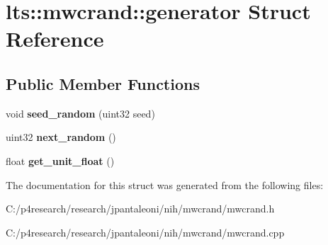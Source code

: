 \hypertarget{structlts_1_1mwcrand_1_1generator}{
\section{lts\-:\-:mwcrand\-:\-:generator \-Struct \-Reference}
\label{structlts_1_1mwcrand_1_1generator}
}
\subsection*{\-Public \-Member \-Functions}
\begin{DoxyCompactItemize}
\item 
\hypertarget{structlts_1_1mwcrand_1_1generator_a93318fe9a6c848ca32c85da536ea57f3}{
void {\bfseries seed\-\_\-random} (uint32 seed)}
\label{structlts_1_1mwcrand_1_1generator_a93318fe9a6c848ca32c85da536ea57f3}

\item 
\hypertarget{structlts_1_1mwcrand_1_1generator_a2418bf248ea16841de65ba5c89a02451}{
uint32 {\bfseries next\-\_\-random} ()}
\label{structlts_1_1mwcrand_1_1generator_a2418bf248ea16841de65ba5c89a02451}

\item 
\hypertarget{structlts_1_1mwcrand_1_1generator_a48774f0b6f6edc1cfb35161e82adf1cd}{
float {\bfseries get\-\_\-unit\-\_\-float} ()}
\label{structlts_1_1mwcrand_1_1generator_a48774f0b6f6edc1cfb35161e82adf1cd}

\end{DoxyCompactItemize}


\-The documentation for this struct was generated from the following files\-:\begin{DoxyCompactItemize}
\item 
\-C\-:/p4research/research/jpantaleoni/nih/mwcrand/mwcrand.\-h\item 
\-C\-:/p4research/research/jpantaleoni/nih/mwcrand/mwcrand.\-cpp\end{DoxyCompactItemize}
